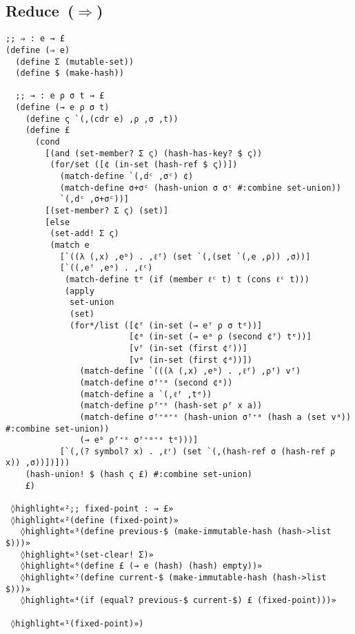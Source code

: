 \documentclass[12pt, oneside]{book}
\begin{document}
\subsection{Reduce~(\(⇒\))}

\begin{Verbatim}
;; ⇒ : e → £
(define (⇒ e)
  (define Σ (mutable-set))
  (define $ (make-hash))

  ;; → : e ρ σ t → £
  (define (→ e ρ σ t)
    (define ς `(,(cdr e) ,ρ ,σ ,t))
    (define £
      (cond
        [(and (set-member? Σ ς) (hash-has-key? $ ς))
         (for/set ([¢ (in-set (hash-ref $ ς))])
           (match-define `(,dᶜ ,σᶜ) ¢)
           (match-define σ+σᶜ (hash-union σ σᶜ #:combine set-union))
           `(,dᶜ ,σ+σᶜ))]
        [(set-member? Σ ς) (set)]
        [else
         (set-add! Σ ς)
         (match e
           [`((λ (,x) ,eᵇ) . ,ℓᶠ) (set `(,(set `(,e ,ρ)) ,σ))]
           [`((,eᶠ ,eᵃ) . ,ℓᶜ)
            (match-define tᵉ (if (member ℓᶜ t) t (cons ℓᶜ t)))
            (apply
             set-union
             (set)
             (for*/list ([¢ᶠ (in-set (→ eᶠ ρ σ tᵉ))]
                         [¢ᵃ (in-set (→ eᵃ ρ (second ¢ᶠ) tᵉ))]
                         [vᶠ (in-set (first ¢ᶠ))]
                         [vᵃ (in-set (first ¢ᵃ))])
               (match-define `(((λ (,x) ,eᵇ) . ,ℓᶠ) ,ρᶠ) vᶠ)
               (match-define σᶠ⁺ᵃ (second ¢ᵃ))
               (match-define a `(,ℓᶠ ,tᵉ))
               (match-define ρᶠ⁺ˣ (hash-set ρᶠ x a))
               (match-define σᶠ⁺ᵃ⁺ˣ (hash-union σᶠ⁺ᵃ (hash a (set vᵃ)) #:combine set-union))
               (→ eᵇ ρᶠ⁺ˣ σᶠ⁺ᵃ⁺ˣ tᵉ)))]
           [`(,(? symbol? x) . ,ℓʳ) (set `(,(hash-ref σ (hash-ref ρ x)) ,σ))])]))
    (hash-union! $ (hash ς £) #:combine set-union)
    £)

 ◊highlight«²;; fixed-point : → £»
 ◊highlight«²(define (fixed-point)»
   ◊highlight«³(define previous-$ (make-immutable-hash (hash->list $)))»
   ◊highlight«⁵(set-clear! Σ)»
   ◊highlight«⁶(define £ (→ e (hash) (hash) empty))»
   ◊highlight«⁷(define current-$ (make-immutable-hash (hash->list $)))»
   ◊highlight«⁴(if (equal? previous-$ current-$) £ (fixed-point)))»

 ◊highlight«¹(fixed-point)»)
\end{Verbatim}
\end{document}
